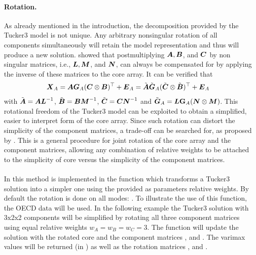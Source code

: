 \documentclass[article,shortnames, nojss]{jss}
\newcommand{\vv}[1]{\mbox{\boldmath$#1$}}
\begin{document}
\paragraph{Rotation.}
As already mentioned in the introduction, the decomposition provided by
the Tucker3 model is not unique. Any arbitrary nonsingular rotation of
all components simultaneously will retain the model representation
and thus will produce a new solution. \citet{Tucker:1966} showed that
postmultiplying $\vv{A}, \vv{B}$, and $\vv{C}$ by non singular matrices,
i.e., $\vv{L}, \vv{M}$, and $\vv{N}$, can always be compensated for by
applying the inverse of these matrices to the core array. It can be
verified that
\begin{equation}
\vv{X}_A = \vv{A}\vv{G}_A(\vv{C} \otimes \vv{B})^\top + \vv{E}_A= \tilde{\vv{A}}\tilde{\vv{G}}_A(\tilde{\vv{C}} \otimes \tilde{\vv{B}})^\top + \vv{E}_A
\end{equation}
with $\tilde{\vv{A}}=\vv{AL}^{-1}$, $\tilde{\vv{B}}=\vv{BM}^{-1}$, $\tilde{\vv{C}}=\vv{CN}^{-1}$ and $\tilde{\vv{G}}_A=\vv{L}\mathbf{G}_A (\vv{N} \otimes \vv{M})$.
This rotational freedom of
the Tucker3 model can be exploited to obtain a simplified, easier
to interpret form of the core array. Since such rotation can distort
the simplicity of the component matrices, a trade-off can be searched for,
as proposed by \citet{kiers1998orthomax}. This is a general procedure
for joint rotation of the core array and the component matrices,
allowing any combination of relative weights to be attached to
the simplicity of core versus the simplicity of the component matrices.\\\\
In  this method is implemented in the function 
which transforms a Tucker3 solution into a simpler one using the provided
as parameters relative weights. By default the rotation is done on all
modes: .
To illustrate the use of this function,
the OECD data  will be used. In the following example the
Tucker3 solution with 3x2x2 components will be simplified by rotating all three component
matrices using equal relative weights $w_A=w_B=w_C=3$. The function will
update the solution  with the rotated core  and the component matrices
,  and . The varimax values will be returned (in )
as well as the rotation matrices ,  and .
\begin{Schunk}
\end{Schunk}
\end{document}
